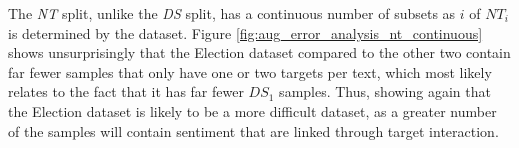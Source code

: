 The \textit{NT} split, unlike the \textit{DS} split, has a continuous number of subsets as $i$ of $NT_i$ is determined by the dataset. Figure \ref{fig:aug_error_analysis_nt_continuous} shows unsurprisingly that the Election dataset compared to the other two contain far fewer samples that only have one or two targets per text, which most likely relates to the fact that it has far fewer $DS_1$ samples. Thus, showing again that the Election dataset is likely to be a more difficult dataset, as a greater number of the samples will contain sentiment that are linked through target interaction. 
\begin{figure}[h!]
    \begin{floatrow}
    \end{floatrow}
\end{figure}
